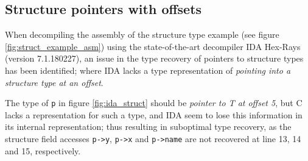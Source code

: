 
\clearpage

\subsection{Structure pointers with offsets}
\label{app:structure_pointers_with_offsets}

When decompiling the assembly of the structure type example (see figure \ref{fig:struct_example_asm}) using the state-of-the-art decompiler IDA Hex-Rays (version 7.1.180227), an issue in the type recovery of pointers to structure types has been identified; where IDA lacks a type representation of \textit{pointing into a structure type at an offset}.

The type of \texttt{p} in figure \ref{fig:ida_struct} should be \textit{pointer to T at offset 5}, but C lacks a representation for such a type, and IDA seem to lose this information in its internal representation; thus resulting in suboptimal type recovery, as the structure field accesses \texttt{p->y}, \texttt{p->x} and \texttt{p->name} are not recovered at line 13, 14 and 15, respectively.

